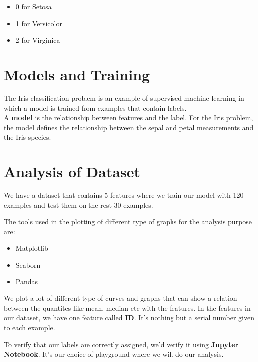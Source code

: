 \documentclass[11pt,letterpaper]{article}
\begin{document}
\begin{itemize}
\item 0 for Setosa
\item 1 for Versicolor
\item 2 for Virginica
\end{itemize}

\section{Models and Training}
The Iris classification problem is an example of supervised machine learning in which a model is trained from examples that contain labels.\\

\noindent
A \textbf{model} is the relationship between features and the label. For the Iris problem, the model defines the relationship between the sepal and petal measurements and the Iris species.

\newpage

\section{Analysis of Dataset}
We have a dataset that contains 5 features where we train our model with 120 examples and test them on the rest 30 examples.

\noindent
The tools used in the plotting of different type of graphs for the analysis purpose are:
\begin{itemize}
\item Matplotlib
\item Seaborn
\item Pandas
\end{itemize}

\noindent
We plot a lot of different type of curves and graphs that can show a relation between the quantites like mean, median etc with the features.
In the features in our dataset, we have one feature called \textbf{ID}.
It's nothing but a serial number given to each example.

\noindent
To verify that our labels are correctly assigned, we'd verify it using \textbf{Jupyter Notebook}. It's our choice of playground where we will do our analysis.

\end{document}
